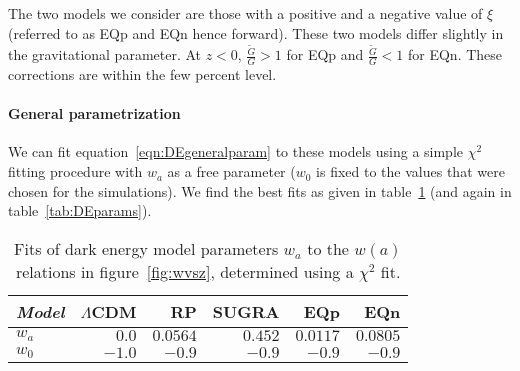 The two models we consider are those with a positive and a negative value of $\xi$ (referred to as EQp and EQn hence forward). These two models differ slightly in the gravitational parameter. At $z<0$, $\frac{\tilde{G}}G > 1$ for EQp and $\frac{\tilde{G}}G < 1$ for EQn. These corrections are within the few percent level.

\paragraph*{General parametrization}

We can fit equation~\ref{eqn:DEgeneralparam} to these models using a simple $\chi^2$ fitting procedure with $w_a$ as a free parameter ($w_0$ is fixed to the values that were chosen for the simulations). We find the best fits as given in table~\ref{tab:wafits} (and again in table~\ref{tab:DEparams}).

\begin{table}
\begin{tabular*}{\textwidth}{@{\extracolsep{\fill}}lrrrrr}
\itshape Model & $\Lambda$CDM & RP & SUGRA & EQp & EQn \\ \hline
$w_a$ & $0.0$ & $0.0564$ & $0.452$ & $0.0117$ & $0.0805$ \\
$w_0$ & $-1.0$  & $-0.9$ & $-0.9$ & $-0.9$ & $-0.9$ \\
\end{tabular*}
\caption{Fits of dark energy model parameters $w_a$ to the $w(a)$ relations in figure~\ref{fig:wvsz}, determined using a $\chi^2$ fit.}
\label{tab:wafits}
\end{table}
